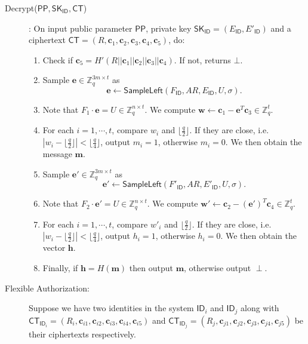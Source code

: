 \documentclass[runningheads,10pt]{llncs}
\def\ZZ{\mathbb{Z}}
\def\bf{\mathbf}
\def\SK{\mathsf{SK}}
\def\PP{\mathsf{PP}}
\def\CT{\mathsf{CT}}
\def\SampleLeft{\mathsf{SampleLeft}}
\def\e{\bf{e}}
\def\c{\bf{c}}
\def\ID{\mathsf{ID}}
\def\id{\mathsf{id}}
\begin{document}
\begin{description}
	\item[Decrypt($\PP,\SK_\ID,\CT$)]: On input public parameter $\PP$, private key $\SK_\ID=(E_\ID,E'_\ID)$ and a ciphertext $\CT=(R,\c_1,\c_2,\c_3,\c_4,\c_5)$, do:
	\begin{enumerate}
		\item Check if $\c_5=H'(R||\c_1||\c_2||\c_3||\c_4)$. If not, returns $\bot$.
		\item Sample $\e\in\ZZ_q^{3m\times t}$ as 
		$$\e\gets\SampleLeft(F_\ID,AR,E_\ID,U,\sigma).$$
		\item Note that $F_1\cdot\e=U\in\ZZ_q^{n\times t}$. We compute $\bf{w}\gets\c_1-\e^T\c_3\in\ZZ_q^t$.
		\item For each $i=1,\cdots, t$, compare $w_i$ and $\lfloor\frac{q}{2}\rfloor$. If they are close, i.e. $\left|w_i - \lfloor\frac{q}{2}\rfloor \right| < \lfloor\frac{q}{4}\rfloor$, output $m_i=1$, otherwise $m_i=0$. We then obtain the message $\bf{m}$.
		\item Sample $\e'\in\ZZ_q^{3m\times t}$ as 
		$$\e'\gets\SampleLeft(F'_\ID,AR,E'_\ID,U,\sigma).$$
		\item Note that $F_2\cdot\e'=U\in\ZZ_q^{n\times t}$. We compute $\bf{w}'\gets\c_2-(\e')^T\c_4\in\ZZ_q^t$.
		\item For each $i=1,\cdots,t$, compare $w'_i$ and $\lfloor\frac{q}{2}\rfloor$. If they are close, i.e. $\left|w_i - \lfloor\frac{q}{2}\rfloor \right| < \lfloor\frac{q}{4}\rfloor$, output $h_i=1$, otherwise $h_i=0$. We then obtain the vector $\bf{h}$.
		\item Finally, if $\bf{h}=H(\bf{m})$ then output $\bf{m}$, otherwise output $\perp$.\\
	\end{enumerate}
	
	\item[Flexible Authorization:] Suppose we have two identities in the system $\ID_i$ and $\ID_j$ along with $\CT_{\ID_i} = (R_{i}, \c_{i1}, \c_{i2}, \c_{i3}, \c_{i4},\c_{i5})$ and $\CT_{\ID_j} = (R_{j}, \c_{j1}, \c_{j2}, \c_{j3}, \c_{j4},\c_{j5})$ be their ciphertexts respectively.
	

\end{description}
\end{document}
